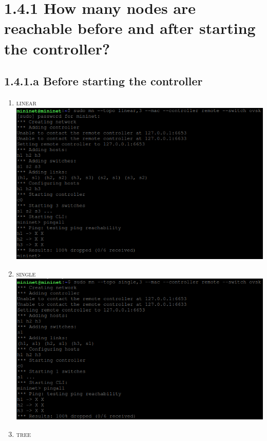\documentclass{article}
\begin{document}
	\pagestyle{fancy}
	
	\section*{1.4.1 How many nodes are reachable before and after starting the controller?}
	\begin{adjustwidth}{2em}{2em}
		\subsection*{1.4.1.a Before starting the controller}
		\begin{adjustwidth}{2em}{2em}
		\begin{enumerate}
			\item \textsc{linear} \\
			\includegraphics[scale=0.5]{linear_before.png}
			\item \textsc{single} \\
			\includegraphics[scale=0.45]{single_before.png}
			\item \textsc{tree} \\

\end{enumerate}
\end{adjustwidth}
\end{adjustwidth}
\end{document}
